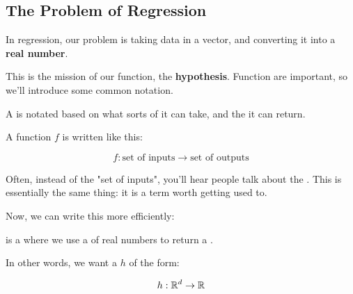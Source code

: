         
        
        
    \subsection{The Problem of Regression}
    
        In regression, our problem is taking data in a vector, and converting it into a \textbf{real number}. 
        
        This is the mission of our function, the \textbf{hypothesis}. Function are important, so we'll introduce some common notation.\\
        
        \begin{notation}
            A  is notated based on what sorts of  it can take, and the  it can return. 
            
            A function $f$ is written like this:
            
            \begin{equation*}
                f: \text{set of inputs} \rightarrow \text{set of outputs}
            \end{equation*}
        \end{notation}
        
        Often, instead of the "set of inputs", you'll hear people talk about the . This is essentially the same thing: it is a term worth getting used to.
        
        Now, we can write this more efficiently:\\
        
        \begin{definition}
             is a  where we use a  of real numbers to return a .
            
            In other words, we want a  $h$ of the form:
            
            \begin{equation*}
                h: \mathbb R^d \rightarrow \mathbb R
            \end{equation*}
            
        \end{definition}
        
